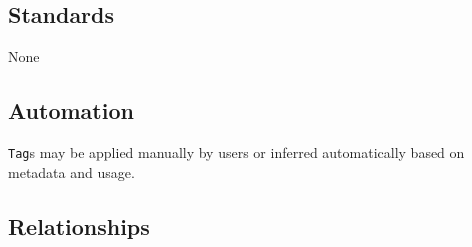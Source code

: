 \documentclass[
]{article}
\begin{document}
\subsection{Standards}\label{standards-36}

None

\subsection{Automation}\label{automation-36}

\texttt{Tag}s may be applied manually by users or inferred automatically
based on metadata and usage.

\subsection{Relationships}\label{relationships-29}
\end{document}
